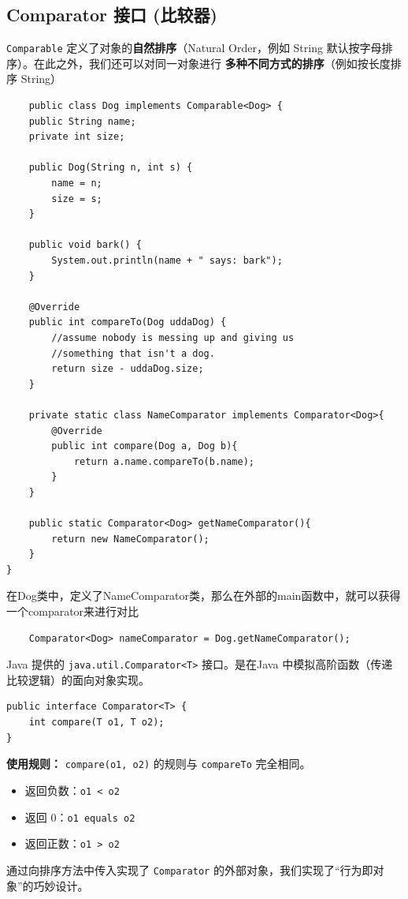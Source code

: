 \documentclass[12pt, a4paper, openany]{ctexbook} %
\begin{document}
\subsection{Comparator 接口 (比较器)}
\texttt{Comparable} 定义了对象的\textbf{自然排序}（Natural Order，例如 String 默认按字母排序）。在此之外，我们还可以对同一对象进行 \textbf{多种不同方式的排序}（例如按长度排序 String）
\begin{lstlisting}
    public class Dog implements Comparable<Dog> {
    public String name;
    private int size;

    public Dog(String n, int s) {
        name = n;
        size = s;
    }

    public void bark() {
        System.out.println(name + " says: bark");
    }

    @Override
    public int compareTo(Dog uddaDog) {
        //assume nobody is messing up and giving us
        //something that isn't a dog.
        return size - uddaDog.size;
    }

    private static class NameComparator implements Comparator<Dog>{
        @Override
        public int compare(Dog a, Dog b){
            return a.name.compareTo(b.name);
        }
    }

    public static Comparator<Dog> getNameComparator(){
        return new NameComparator();
    }
}
\end{lstlisting}
\par
在Dog类中，定义了NameComparator类，那么在外部的main函数中，就可以获得一个comparator来进行对比
\begin{lstlisting}
    Comparator<Dog> nameComparator = Dog.getNameComparator();
\end{lstlisting}
\par
Java 提供的 \texttt{java.util.Comparator<T>} 接口。是在Java 中模拟高阶函数（传递比较逻辑）的面向对象实现。

\begin{lstlisting}
public interface Comparator<T> {
    int compare(T o1, T o2);
}
\end{lstlisting}

\textbf{使用规则：} \texttt{compare(o1, o2)} 的规则与 \texttt{compareTo} 完全相同。
\begin{itemize}
    \item 返回负数：\texttt{o1 < o2}
    \item 返回 0：\texttt{o1 equals o2}
    \item 返回正数：\texttt{o1 > o2}
\end{itemize}
\par
通过向排序方法中传入实现了 \texttt{Comparator} 的外部对象，我们实现了“行为即对象”的巧妙设计。
\end{document}
